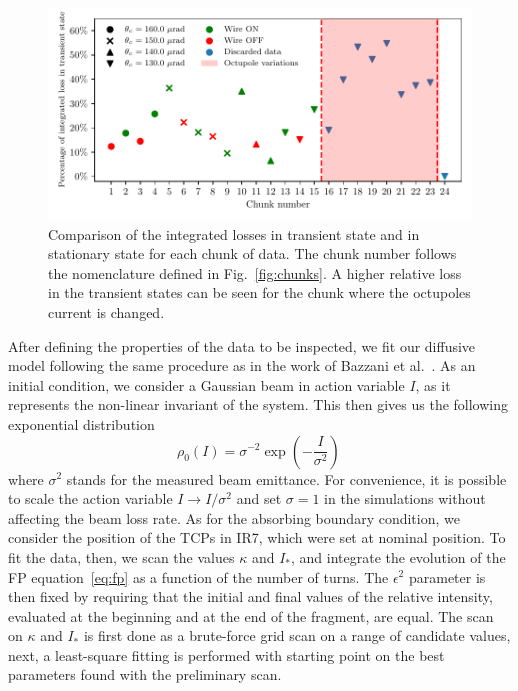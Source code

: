 \begin{figure}[hpt]
    \centering
    \includegraphics[width=1.0\textwidth]{5_wire_compensators_LHC/figs/losses_comparison.pdf}
    \caption{Comparison of the integrated losses in transient state and in stationary state for each chunk of data. The chunk number follows the nomenclature defined in Fig.~\ref{fig:chunks}. A higher relative loss in the transient states can be seen for the chunk where the octupoles current is changed.}
    \label{fig:wire_loss_comp}
\end{figure}

After defining the properties of the data to be inspected, we fit our diffusive model following the same procedure as in the work of Bazzani et al.~\cite{bazzani2020diffusion}. As an initial condition, we consider a Gaussian beam in action variable $I$, as it represents the non-linear invariant of the system. This then gives us the following exponential distribution
\begin{equation}
    \rho_0(I) = \sigma^{-2}\exp\left(-\frac{I}{\sigma^2}\right)\,
\end{equation}
where $\sigma^2$ stands for the measured beam emittance. For convenience, it is possible to scale the action variable $I\to I/\sigma^2$ and set $\sigma=1$ in the simulations without affecting the beam loss rate. As for the absorbing boundary condition, we consider the position of the TCPs in IR7, which were set at nominal position. To fit the data, then, we scan the values $\kappa$ and $I_\ast$, and integrate the evolution of the FP equation~\eqref{eq:fp} as a function of the number of turns. The $\epsilon^2$ parameter is then fixed by requiring that the initial and final values of the relative intensity, evaluated at the beginning and at the end of the fragment, are equal. The scan on $\kappa$ and $I_\ast$ is first done as a brute-force grid scan on a range of candidate values, next, a least-square fitting is performed with starting point on the best parameters found with the preliminary scan.

